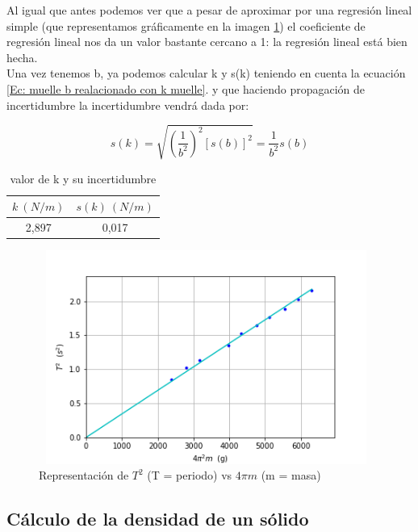 \documentclass[12pt,a4paper]{book}
\begin{document}
Al igual que antes podemos ver que a pesar de aproximar por una regresión lineal simple (que representamos gráficamente en la imagen \ref{fig:Plot2-muelle}) el coeficiente de regresión lineal nos da un valor bastante cercano a 1: la regresión lineal está bien hecha. \\

Una vez tenemos b, ya podemos calcular k y s(k) teniendo en cuenta la ecuación \ref{Ec: muelle b realacionado con k muelle}. y que  haciendo propagación de incertidumbre la incertidumbre vendrá dada por:

\begin{equation}
s(k)=\sqrt{(\dfrac{1}{b^2})^2[s(b)]^2}=\dfrac{1}{b^2}s(b)
\label{EC: muelle incertidumbre de k por el periodo muelle}
\end{equation}

\begin{table}[h!] %
\begin{center}
\begin{tabular}{|c|c|}
\hline
$ k \ (N/m)$ & 	 $s(k) \ (N/m)$ \\ \hline
2,897 & 	 0,017 \\
\hline
\end{tabular}
\label{Tab:muelle-valor de k, s(k)}
\caption{valor de k y su incertidumbre}
\end{center}
\end{table}

\begin{figure}[h!] %
\centering
\includegraphics[width=11cm, height=7cm]{Plot2-muelle.png}
\caption{Representación de $T^2$ (T = periodo) vs $4 \pi m$ (m = masa)}
\label{fig:Plot2-muelle}
\end{figure}


\subsection{Cálculo de la densidad de un sólido}
\end{document}
